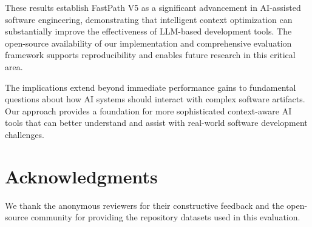 \documentclass[conference]{IEEEtran}
\begin{document}
These results establish FastPath V5 as a significant advancement in AI-assisted software engineering, demonstrating that intelligent context optimization can substantially improve the effectiveness of LLM-based development tools. The open-source availability of our implementation and comprehensive evaluation framework supports reproducibility and enables future research in this critical area.

The implications extend beyond immediate performance gains to fundamental questions about how AI systems should interact with complex software artifacts. Our approach provides a foundation for more sophisticated context-aware AI tools that can better understand and assist with real-world software development challenges.

\section*{Acknowledgments}
We thank the anonymous reviewers for their constructive feedback and the open-source community for providing the repository datasets used in this evaluation.



\end{document}
